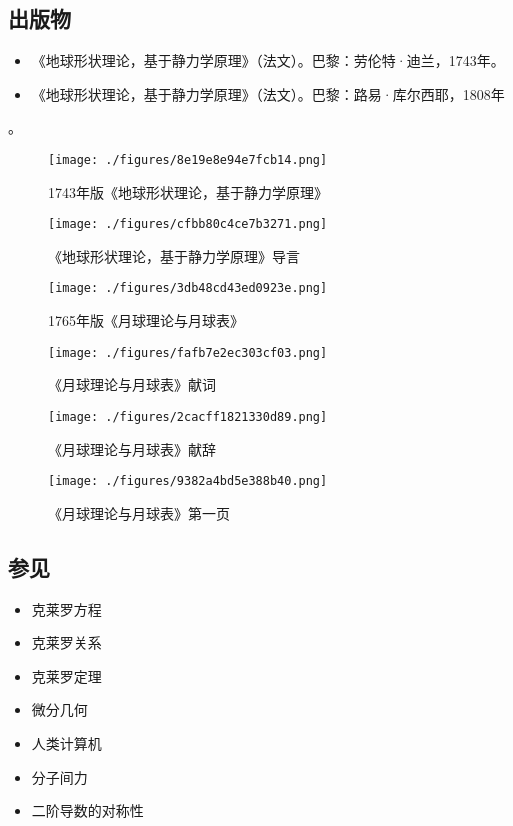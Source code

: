 \subsection{出版物}  
\begin{itemize}
\item 《地球形状理论，基于静力学原理》（法文）。巴黎：劳伦特·迪兰，1743年。  
\item 《地球形状理论，基于静力学原理》（法文）。巴黎：路易·库尔西耶，1808年
\end{itemize}。
\begin{figure}[ht]
\centering
\texttt{[image: ./figures/8e19e8e94e7fcb14.png]}
\caption{1743年版《地球形状理论，基于静力学原理》} \label{fig_Alexis_4}
\end{figure}
\begin{figure}[ht]
\centering
\texttt{[image: ./figures/cfbb80c4ce7b3271.png]}
\caption{《地球形状理论，基于静力学原理》导言} \label{fig_Alexis_5}
\end{figure}
\begin{figure}[ht]
\centering
\texttt{[image: ./figures/3db48cd43ed0923e.png]}
\caption{1765年版《月球理论与月球表》} \label{fig_Alexis_6}
\end{figure}
\begin{figure}[ht]
\centering
\texttt{[image: ./figures/fafb7e2ec303cf03.png]}
\caption{《月球理论与月球表》献词} \label{fig_Alexis_7}
\end{figure}
\begin{figure}[ht]
\centering
\texttt{[image: ./figures/2cacff1821330d89.png]}
\caption{《月球理论与月球表》献辞} \label{fig_Alexis_8}
\end{figure}
\begin{figure}[ht]
\centering
\texttt{[image: ./figures/9382a4bd5e388b40.png]}
\caption{《月球理论与月球表》第一页} \label{fig_Alexis_9}
\end{figure}
\subsection{参见}  
\begin{itemize}
\item 克莱罗方程  
\item 克莱罗关系  
\item 克莱罗定理  
\item 微分几何  
\item 人类计算机  
\item 分子间力  
\item 二阶导数的对称性
\end{itemize}
